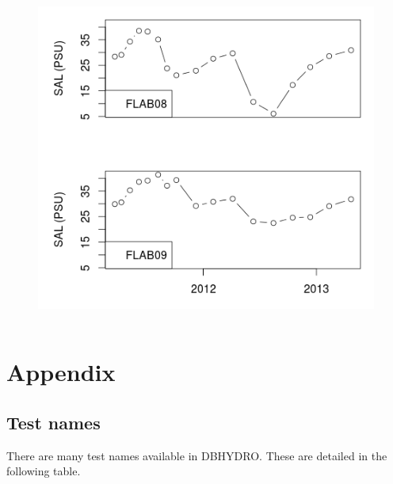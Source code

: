 \documentclass[12pt,notitlepage]{article}
\begin{document}
\vspace{2pt}
\begin{figure}[H]
\begin{center}
\includegraphics[width=343.5pt,height=310.8pt]{Rplot}
\end{center}
\label{fig:zero}
\end{figure}



\section{\label{sec:appendix}Appendix}
\subsection{Test names}
There are many test names available in DBHYDRO. These are detailed in the following table.\\
\end{document}
